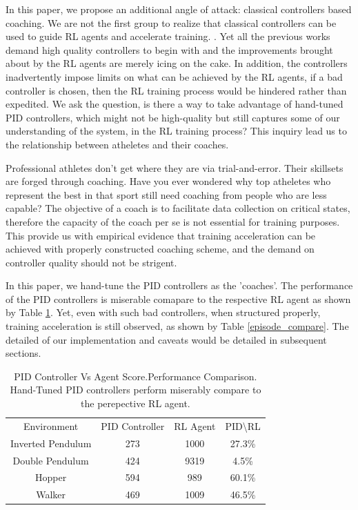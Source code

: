 \documentclass[journal]{IEEEtran}
\begin{document}
In this paper, we propose an additional angle of attack: classical controllers based coaching. We are not the first group to realize that classical controllers can be used to guide RL agents and accelerate training. \cite{Xie2018LearningWT}\cite{Carlucho2017IncrementalQS}\cite{Pavse2020RIDMRI}. Yet all the previous works demand high quality controllers to begin with and the improvements brought about by the RL agents are merely icing on the cake. In addition, the controllers inadvertently impose limits on what can be achieved by the RL agents, if a bad controller is chosen, then the RL training process would be hindered rather than expedited. We ask the question, is there a way to take advantage of hand-tuned PID controllers, which might not be high-quality but still captures some of our understanding of the system, in the RL training process? This inquiry lead us to the relationship between atheletes and their coaches.

Professional athletes don't get where they are via trial-and-error. Their skillsets are forged through coaching. Have you ever wondered why top atheletes who represent the best in that sport still need coaching from people who are less capable? The objective of a coach is to facilitate data collection on critical states, therefore the capacity of the coach per se is not essential for training purposes. This provide us with empirical evidence that training acceleration can be achieved with properly constructed coaching scheme, and the demand on controller quality should not be strigent. 

In this paper, we hand-tune the PID controllers as the 'coaches'. The performance of the PID controllers is miserable comapare to the respective RL agent as shown by Table \ref{score_compare}. Yet, even with such bad controllers, when structured properly, training acceleration is still observed, as shown by Table \ref{episode_compare}. The detailed of our implementation and caveats would be detailed in subsequent sections.



\begin{table}[H]
\footnotesize
\caption{PID Controller Vs Agent Score.Performance Comparison. Hand-Tuned PID controllers perform miserably compare to the perepective RL agent.}
\label{score_compare}
\centering
\begin{tabular}{ cccc }
\rowcolor{airforceblue}
Environment &   PID Controller &RL Agent &PID\textbackslash RL \\
Inverted Pendulum &  273 & 1000&  27.3\%\\
\rowcolor{beaublue}

Double Pendulum &  424 & 9319& 4.5\%\\

Hopper &  594 & 989& 60.1\%\\
\rowcolor{beaublue}
Walker &  469 & 1009& 46.5\%\\
\end{tabular}
\end{table}
\end{document}
